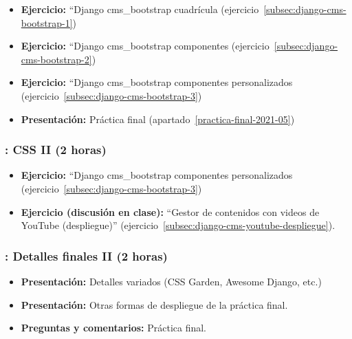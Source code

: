 \documentclass[a4paper,12pt]{article}
\begin{document}
 \begin{itemize}
   \item \textbf{Ejercicio:} ``Django cms\_bootstrap cuadrícula (ejercicio~\ref{subsec:django-cms-bootstrap-1})
   \item \textbf{Ejercicio:} ``Django cms\_bootstrap componentes (ejercicio~\ref{subsec:django-cms-bootstrap-2})
   \item \textbf{Ejercicio:} ``Django cms\_bootstrap componentes personalizados (ejercicio~\ref{subsec:django-cms-bootstrap-3})
   \item \textbf{Presentación:} Práctica final (apartado~\ref{practica-final-2021-05})
\end{itemize}

\subsubsection{\juevesM: CSS II (2 horas)}
\label{cal:juevesM}

\begin{itemize}
\item \textbf{Ejercicio:} ``Django cms\_bootstrap componentes personalizados (ejercicio~\ref{subsec:django-cms-bootstrap-3})
\item \textbf{Ejercicio (discusión en clase):} ``Gestor de contenidos con videos de YouTube (despliegue)'' (ejercicio~\ref{subsec:django-cms-youtube-despliegue}).
\end{itemize}

 \subsubsection{\martesO: Detalles finales II  (2 horas)}
 \label{cal:martesO}

 \begin{itemize}
 \item \textbf{Presentación:} Detalles variados (CSS Garden, Awesome Django, etc.)
 \item \textbf{Presentación:} Otras formas de despliegue de la práctica final.
 \item \textbf{Preguntas y comentarios:} Práctica final.
 \end{itemize}
\end{document}
